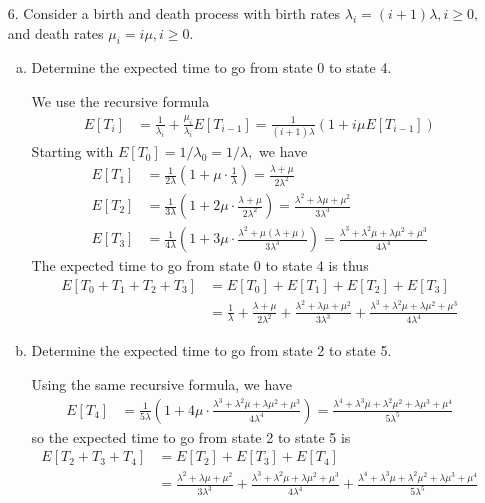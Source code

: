 \documentclass{article}
\begin{document}
\begin{itemize}
	\item[6.] Consider a birth and death process with birth rates $\lambda_i=(i+1)\lambda, i\ge0,$ and death rates $\mu_i=i\mu, i\ge0.$
		\begin{enumerate}[(a)]
			\item Determine the expected time to go from state 0 to state 4.
				\begin{soln}
					We use the recursive formula
					\begin{align*}
						E[T_i] &= \frac{1}{\lambda_i} + \frac{\mu_i}{\lambda_i}E[T_{i-1}] = \frac{1}{(i+1)\lambda} \left( 1 + i\mu E[T_{i-1}] \right)
					\end{align*}
					Starting with $E[T_0]=1/\lambda_0 = 1/\lambda,$ we have
					\begin{align*}
						E[T_1] &= \frac{1}{2\lambda}\left( 1+\mu\cdot \frac{1}{\lambda} \right) = \frac{\lambda+\mu}{2\lambda^2} \\
						E[T_2] &= \frac{1}{3\lambda} \left( 1+2\mu\cdot \frac{\lambda+\mu}{2\lambda^2} \right) = \frac{\lambda^2+\lambda\mu+\mu^2}{3\lambda^3} \\
						E[T_3] &= \frac{1}{4\lambda} \left( 1+3\mu\cdot \frac{\lambda^2+\mu(\lambda+\mu)}{3\lambda^3} \right) = \frac{\lambda^3+\lambda^2\mu + \lambda\mu^2 + \mu^3}{4\lambda^4}
					\end{align*}
					The expected time to go from state 0 to state 4 is thus
					\begin{align*}
						E[T_0+T_1+T_2+T_3] &= E[T_0] + E[T_1] + E[T_2] + E[T_3] \\
						&= \frac{1}{\lambda} + \frac{\lambda+\mu}{2\lambda^2} + \frac{\lambda^2+\lambda\mu + \mu^2}{3\lambda^3} + \frac{\lambda^3+\lambda^2\mu+\lambda\mu^2+\mu^3}{4\lambda^4}
					\end{align*}
				\end{soln}

			\item Determine the expected time to go from state 2 to state 5.
				\begin{soln}
					Using the same recursive formula, we have
					\begin{align*}
						E[T_4] &= \frac{1}{5\lambda}\left( 1+4\mu\cdot \frac{\lambda^3+\lambda^2\mu+\lambda\mu^2+\mu^3}{4\lambda^4} \right) = \frac{\lambda^4+\lambda^3\mu+\lambda^2\mu^2+\lambda\mu^3+\mu^4}{5\lambda^5}
					\end{align*}
					so the expected time to go from state 2 to state 5 is
					\begin{align*}
						E[T_2+T_3+T_4] &= E[T_2] + E[T_3] + E[T_4] \\
						&= \frac{\lambda^2+\lambda\mu+\mu^2}{3\lambda^3} + \frac{\lambda^3+\lambda^2\mu+\lambda\mu^2+\mu^3}{4\lambda^4} + \frac{\lambda^4+\lambda^3\mu+\lambda^2\mu^2+\lambda\mu^3+\mu^4}{5\lambda^5}
					\end{align*}
				\end{soln}


\end{enumerate}
\end{itemize}
\end{document}
